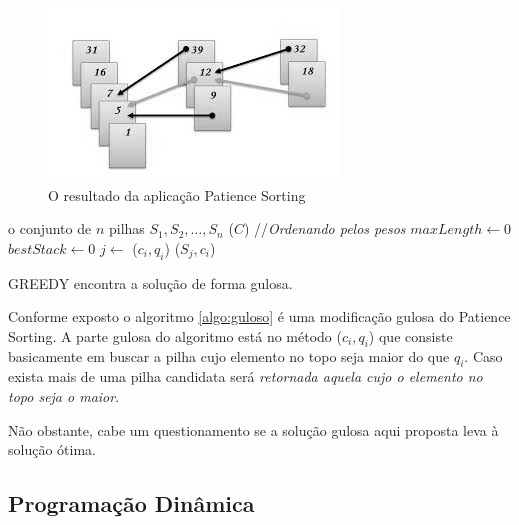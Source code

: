 \documentclass[12pt]{article}
\begin{document}
\begin{figure}[ht]
\centering
\includegraphics[width=.5\textwidth]{patiente_sort.jpg}
\caption{O resultado da aplicação Patience Sorting}
\label{fig:patiente_sort}
\end{figure}


\begin{algorithm}
\DontPrintSemicolon %

\INITIALIZE o conjunto de $n$ pilhas ${S_1,S_2,\ldots,S_n}$\;
\SORT($C$) {//\textit{Ordenando pelos pesos}}\;
$maxLength \gets 0$\;
$bestStack \gets 0$\;
 {
   $j \gets $ \GREEDYCHOICE($c_i,q_i$)\;
   \PUSH($S_j,c_i$)\;
}
\;
\caption{\sc GREEDY encontra a solução de forma gulosa.}
\label{algo:guloso}
\end{algorithm}

Conforme exposto o algoritmo \ref{algo:guloso} é uma modificação gulosa do Patience Sorting. A parte gulosa do algoritmo está no método \textsc{\GREEDYCHOICE($c_i,q_i$)} que consiste basicamente em buscar a pilha cujo elemento no topo seja maior do que $q_i$. Caso exista mais de uma pilha candidata será \textit{retornada aquela cujo o elemento no topo seja o maior}.

Não obstante, cabe um questionamento se a solução gulosa aqui proposta leva à solução ótima.

\subsection{Programação Dinâmica}
\label{subsec:pd}
\end{document}
